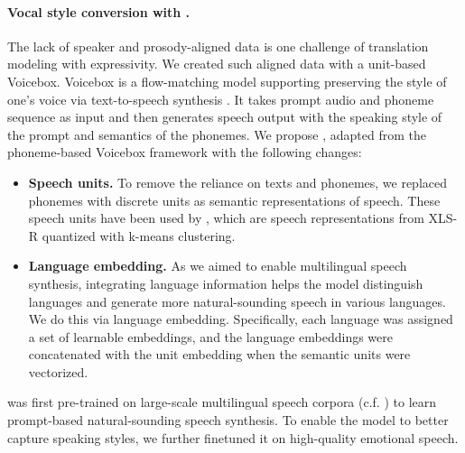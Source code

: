 \paragraph{Vocal style conversion with \unitvb.} 
\label{sec:expressive:unit_voicebox}
The lack of speaker and prosody-aligned data is one challenge of translation modeling with expressivity. We created such aligned data with a unit-based Voicebox. Voicebox is a flow-matching model supporting preserving the style of one's voice via text-to-speech synthesis \citep{le2023voicebox}. It takes prompt audio and phoneme sequence as input and then generates speech output with the speaking style of the prompt and semantics of the phonemes. We propose \unitvb, adapted from the phoneme-based Voicebox framework with the following changes:
\begin{itemize}
    \item \textbf{Speech units.} To remove the reliance on texts and phonemes, we replaced phonemes with discrete units as semantic representations of speech. These speech units have been used by \mfourttwo, which are speech representations from XLS-R quantized with k-means clustering. 
    \item \textbf{Language embedding.} As we aimed to enable multilingual speech synthesis, integrating language information helps the model distinguish languages and generate more natural-sounding speech in various languages. We do this via language embedding. Specifically, each language was assigned a set of learnable embeddings, and the language embeddings were concatenated with the unit embedding when the semantic units were vectorized.
\end{itemize}

\noindent \unitvb was first pre-trained on large-scale multilingual speech corpora (c.f. ) to learn prompt-based natural-sounding speech synthesis. To enable the model to better capture speaking styles, we further finetuned it on high-quality emotional speech.

